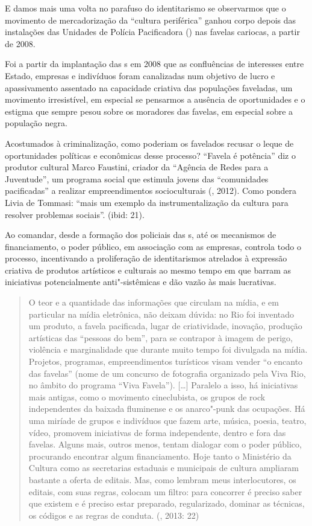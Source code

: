 E damos mais uma volta no parafuso do identitarismo se observarmos que o
movimento de mercadorização da ``cultura periférica'' ganhou corpo
depois das instalações das Unidades de Polícia Pacificadora () nas
favelas cariocas, a partir de 2008.

Foi a partir da implantação das s em 2008 que as confluências de
interesses entre Estado, empresas e indivíduos foram canalizadas num
objetivo de lucro e apassivamento assentado na capacidade criativa das
populações faveladas, um movimento irresistível, em especial se
pensarmos a ausência de oportunidades e o estigma que sempre pesou sobre
os moradores das favelas, em especial sobre a população negra.

Acostumados à criminalização, como poderiam os favelados recusar o leque
de oportunidades políticas e econômicas desse processo? ``Favela é
potência'' diz o produtor cultural Marco Faustini, criador da ``Agência
de Redes para a Juventude'', um programa social que estimula jovens das
``comunidades pacificadas'' a realizar empreendimentos socioculturais
(, 2012). Como pondera Livia de Tommasi: ``mais um exemplo da
instrumentalização da cultura para resolver problemas sociais''. (ibid:
21).

Ao comandar, desde a formação dos policiais das s, até os mecanismos
de financiamento, o poder público, em associação com as empresas,
controla todo o processo, incentivando a proliferação de identitarismos
atrelados à expressão criativa de produtos artísticos e culturais ao
mesmo tempo em que barram as iniciativas potencialmente anti"-sistêmicas
e dão vazão às mais lucrativas.

\begin{quote}
O teor e a quantidade das informações que circulam na mídia, e em
particular na mídia eletrônica, não deixam dúvida: no Rio foi inventado
um produto, a favela pacificada, lugar de criatividade, inovação,
produção artísticas das ``pessoas do bem'', para se contrapor à imagem
de perigo, violência e marginalidade que durante muito tempo foi
divulgada na mídia. Projetos, programas, empreendimentos turísticos
visam vender ``o encanto das favelas'' (nome de um concurso de
fotografia organizado pela  Viva Rio, no âmbito do programa ``Viva
Favela''). {[}\ldots{}{]} Paralelo a isso, há iniciativas mais antigas, como
o movimento cineclubista, os grupos de rock independentes da baixada
fluminense e os anarco"-punk das ocupações. Há uma miríade de grupos e
indivíduos que fazem arte, música, poesia, teatro, vídeo, promovem
iniciativas de forma independente, dentro e fora das favelas. Alguns
mais, outros menos, tentam dialogar com o poder público, procurando
encontrar algum financiamento. Hoje tanto o Ministério da Cultura como
as secretarias estaduais e municipais de cultura ampliaram bastante a
oferta de editais. Mas, como lembram meus interlocutores, os editais,
com suas regras, colocam um filtro: para concorrer é preciso saber que
existem e é preciso estar preparado, regularizado, dominar as técnicas,
os códigos e as regras de conduta. (, 2013: 22)
\end{quote}

